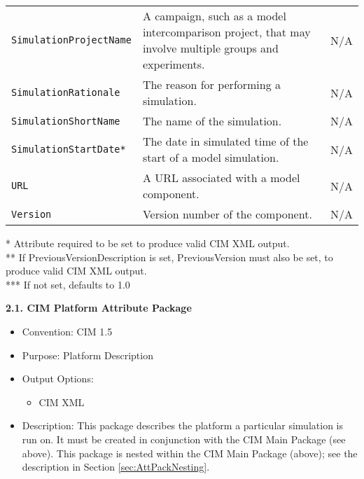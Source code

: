 \begin{tabular}{|p{7cm}|p{5cm}|p{2cm}}
     {\tt SimulationProjectName} & A campaign, such as a model intercomparison project, that may involve multiple groups and experiments. & N/A \\ 
     {\tt SimulationRationale} & The reason for performing a simulation. & N/A\\
     {\tt SimulationShortName} & The name of the simulation. & N/A \\
     {\tt SimulationStartDate*} & The date in simulated time of the start of a model simulation. & N/A\\ 
     {\tt URL} & A URL associated with a model component. & N/A \\
     {\tt Version} & Version number of the component. & N/A \\
     \hline\hline
\end{tabular}
\linebreak
 * Attribute required to be set to produce valid CIM XML output. \\
 ** If PreviousVersionDescription is set, PreviousVersion must also be set, to produce valid CIM XML output. \\
 *** If not set, defaults to 1.0

\vspace{.20in}

{\bf 2.1. CIM Platform Attribute Package}

\begin{itemize}
    \item Convention: CIM 1.5
    \item Purpose: Platform Description
    \item Output Options:
    \begin{itemize}
       \item CIM XML 
    \end{itemize} 
    \item Description: This package describes the platform a particular simulation is run on. It must be created in conjunction with the CIM Main Package (see above). This package is nested within the CIM Main Package (above); see the description in Section \ref{sec:AttPackNesting}.
\end{itemize}


